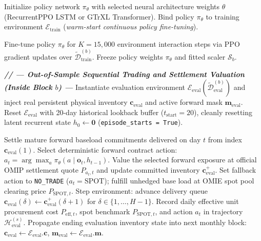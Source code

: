 \begin{algorithm*}[t]
\begin{algorithmic}[1]
            \State Initialize policy network $\pi_\theta$ with selected neural architecture weights $\theta$ (RecurrentPPO LSTM or GTrXL Transformer).
        \Else
            \State Bind policy $\pi_\theta$ to training environment $\mathcal{E}_{\text{train}}$ (\textit{warm-start continuous policy fine-tuning}).
        \EndIf
        
        \State Fine-tune policy $\pi_\theta$ for $K = 15{,}000$ environment interaction steps via PPO gradient updates over $\widetilde{\mathcal{D}}_{\text{train}}^{(b)}$.
        \State Freeze policy weights $\pi_\theta$ and fitted scaler $\mathcal{S}_b$.
        
        \Statex
        \Statex \textbf{\quad\quad\textit{// --- Out-of-Sample Sequential Trading and Settlement Valuation (Inside Block $b$) ---}}
        \State Instantiate evaluation environment $\mathcal{E}_{\text{eval}}(\widetilde{\mathcal{D}}_{\text{eval}}^{(b)})$ and inject real persistent physical inventory $\mathbf{c}_{\text{eval}}$ and active forward mask $\mathbf{m}_{\text{eval}}$.
        \State Reset $\mathcal{E}_{\text{eval}}$ with 20-day historical lookback buffer ($t_{\text{start}} = 20$), cleanly resetting latent recurrent state $h_0 \leftarrow \mathbf{0}$ (\texttt{episode\_starts = True}).
        
            \State Settle mature forward baseload commitments delivered on day $t$ from index $\mathbf{c}_{\text{eval}}(1)$.
                \State Select deterministic forward contract action: $a_t = \arg\max_a \pi_\theta(a \mid \mathbf{o}_t, h_{t-1})$.
                \State Value the selected forward exposure at official OMIP settlement quote $P_{a_t, t}$ and update committed inventory $\mathbf{c}_{\text{eval}}^+$.
            \Else {}
                \State Set fallback action to \texttt{NO\_TRADE} ($a_t = \text{SPOT}$); fulfill unhedged base load at OMIE spot pool clearing price $P_{\text{SPOT}, t}$.
            \EndIf
            \State Step environment: advance delivery queue $\mathbf{c}_{\text{eval}}(\delta) \leftarrow \mathbf{c}_{\text{eval}}^+(\delta+1)$ for $\delta \in \{1, \dots, H-1\}$.
            \State Record daily effective unit procurement cost $P_{\text{eff}, t}$, spot benchmark $P_{\text{SPOT}, t}$, and action $a_t$ in trajectory $\mathcal{H}_{\text{eval}}^{(s)}$.
        \EndFor
        \State Propagate ending evaluation inventory state into next monthly block: $\mathbf{c}_{\text{eval}} \leftarrow \mathcal{E}_{\text{eval}}.\mathbf{c}$, $\mathbf{m}_{\text{eval}} \leftarrow \mathcal{E}_{\text{eval}}.\mathbf{m}$.
    \EndFor
\EndFor


\end{algorithmic}
\end{algorithm*}
